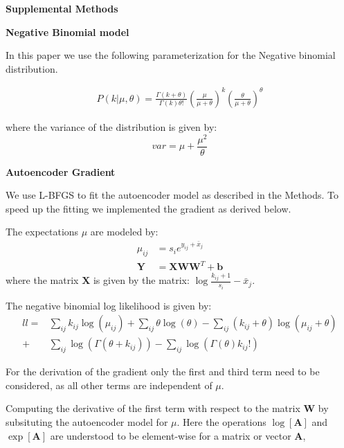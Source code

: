 \documentclass[11pt]{letter}
\newcommand{\matr}[1]{\mathbf{#1}}
\begin{document}
\textbf{Supplemental Methods}

\textbf{Negative Binomial model}

In this paper we use the following parameterization for the Negative binomial distribution.

\begin{align*}
P(k| \mu, \theta) = \frac{\Gamma(k + \theta)}{\Gamma(k) \theta!}  
\left ( \frac{\mu}{\mu + \theta} \right )^{k}
\left ( \frac{\theta}{\mu + \theta} \right)^{\theta} 
\end{align*}

where the variance of the distribution is given by:
\[
var = \mu + \frac{\mu^2}{\theta}
\]

\textbf{Autoencoder Gradient}

We use L-BFGS to fit the autoencoder model as described in the Methods.
To speed up the fitting we implemented the gradient as derived below.

The expectations $\mu$ are modeled by:
\begin{align*}
\mu_{ij} &= s_{i} e^{y_{ij} + \bar{x}_j}\\
\matr{Y} &= \matr{X} \matr{W} \matr{W}^T + \matr{b}
\end{align*}
where the matrix $\matr{X}$ is given by the matrix: $\log{\frac{k_{ij}+1}{s_i}} - \bar{x}_j$. 

The negative binomial log likelihood is given by:
\begin{align*}
ll=& \sum_{ij} k_{ij} \log{(\mu_{ij})} + 
\sum_{ij} \theta \log{(\theta)} -
\sum_{ij} (k_{ij} + \theta) \log{(\mu_{ij} + \theta)} \\
+&\sum_{ij} \log{(\Gamma(\theta + k_{ij}))} 
- \sum_{ij} \log{(\Gamma({\theta}) k_{ij}!)}
\end{align*}

For the derivation of the gradient only the first and third term need to be considered, 
as all other terms are independent of $\mu$.

Computing the derivative of the first term with respect to the matrix $\matr{W}$ by subsituting the autoencoder model for $\mu$. 
Here the operations $\log[\matr{A}]$ and $\exp[\matr{A}]$ are understood to be element-wise for a matrix or vector $\matr{A}$,
\end{document}
